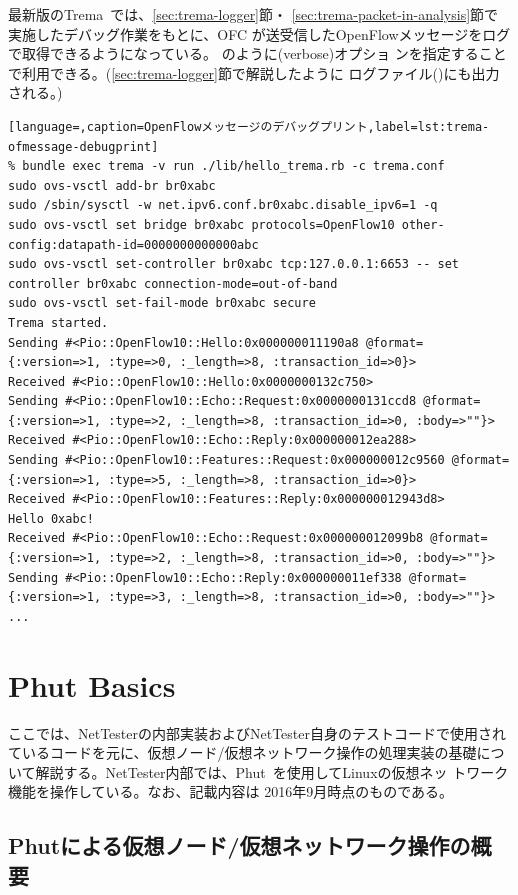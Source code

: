 最新版のTrema~\cite{trema-pr433}では、\ref{sec:trema-logger}節・
\ref{sec:trema-packet-in-analysis}節で実施したデバッグ作業をもとに、OFC
が送受信したOpenFlowメッセージをログで取得できるようになっている。
のように(verbose)オプショ
ンを指定することで利用できる。(\ref{sec:trema-logger}節で解説したように
ログファイル()にも出力される。)
\begin{lstlisting}[language=,caption=OpenFlowメッセージのデバッグプリント,label=lst:trema-ofmessage-debugprint]
% bundle exec trema -v run ./lib/hello_trema.rb -c trema.conf
sudo ovs-vsctl add-br br0xabc
sudo /sbin/sysctl -w net.ipv6.conf.br0xabc.disable_ipv6=1 -q
sudo ovs-vsctl set bridge br0xabc protocols=OpenFlow10 other-config:datapath-id=0000000000000abc
sudo ovs-vsctl set-controller br0xabc tcp:127.0.0.1:6653 -- set controller br0xabc connection-mode=out-of-band
sudo ovs-vsctl set-fail-mode br0xabc secure
Trema started.
Sending #<Pio::OpenFlow10::Hello:0x000000011190a8 @format={:version=>1, :type=>0, :_length=>8, :transaction_id=>0}>
Received #<Pio::OpenFlow10::Hello:0x0000000132c750>
Sending #<Pio::OpenFlow10::Echo::Request:0x0000000131ccd8 @format={:version=>1, :type=>2, :_length=>8, :transaction_id=>0, :body=>""}>
Received #<Pio::OpenFlow10::Echo::Reply:0x000000012ea288>
Sending #<Pio::OpenFlow10::Features::Request:0x000000012c9560 @format={:version=>1, :type=>5, :_length=>8, :transaction_id=>0}>
Received #<Pio::OpenFlow10::Features::Reply:0x000000012943d8>
Hello 0xabc!
Received #<Pio::OpenFlow10::Echo::Request:0x000000012099b8 @format={:version=>1, :type=>2, :_length=>8, :transaction_id=>0, :body=>""}>
Sending #<Pio::OpenFlow10::Echo::Reply:0x000000011ef338 @format={:version=>1, :type=>3, :_length=>8, :transaction_id=>0, :body=>""}>
...
\end{lstlisting}

\section{Phut Basics}
\label{sec:phut_basics}

ここでは、NetTesterの内部実装およびNetTester自身のテストコードで使用され
ているコードを元に、仮想ノード/仮想ネットワーク操作の処理実装の基礎につ
いて解説する。NetTester内部では、Phut~\cite{phut}を使用してLinuxの仮想ネッ
トワーク機能を操作している。なお、記載内容は 2016年9月時点のものである。

\subsection{Phutによる仮想ノード/仮想ネットワーク操作の概要}

